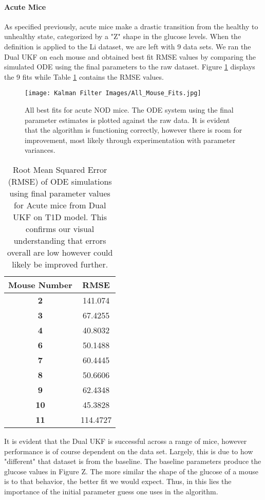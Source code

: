 \documentclass{article}
\begin{document}
\paragraph{Acute Mice}
As specified previously, acute mice make a drastic transition from the healthy to unhealthy state, categorized by a "Z" shape in the glucose levels. When the definition is applied to the Li dataset, we are left with 9 data sets. We ran the Dual UKF on each mouse and obtained best fit RMSE values by comparing the simulated ODE using the final parameters to the raw dataset. Figure \ref{fig:T1D_Dual_AllAcute_Plots} displays the 9 fits while Table \ref{table:T1D_Dual_AllAcute_RMSE} contains the RMSE values.\\

\begin{figure}[H]
    \centering
    \texttt{[image: Kalman Filter Images/All\_Mouse\_Fits.jpg]}
    \caption{All best fits for acute NOD mice. The ODE system using the final parameter estimates is plotted against the raw data. It is evident that the algorithm is functioning correctly, however there is room for improvement, most likely through experimentation with parameter variances.}
    \label{fig:T1D_Dual_AllAcute_Plots}
\end{figure}

\begin{table}[H]
  \begin{center}
    \label{tab:table1}
    \begin{tabular}{c|c} %
      \textbf{Mouse Number} & \textbf{RMSE} \\
      \hline
      \textbf{2} & 141.074\\
      \textbf{3} & 67.4255\\
      \textbf{4} & 40.8032\\
      \textbf{6} & 50.1488\\
      \textbf{7} & 60.4445\\
      \textbf{8} & 50.6606\\
      \textbf{9} & 62.4348\\
      \textbf{10} & 45.3828\\
      \textbf{11} & 114.4727
    \end{tabular}
    \caption{Root Mean Squared Error (RMSE) of ODE simulations using final parameter values for Acute mice from Dual UKF on T1D model. This confirms our visual understanding that errors overall are low however could likely be improved further.}
    \label{table:T1D_Dual_AllAcute_RMSE}
  \end{center}
\end{table}
It is evident that the Dual UKF is successful across a range of mice, however performance is of course dependent on the data set. Largely, this is due to how "different" that dataset is from the baseline. The baseline parameters produce the glucose values in Figure Z. The more similar the shape of the glucose of a mouse is to that behavior, the better fit we would expect. Thus, in this lies the importance of the initial parameter guess one uses in the algorithm.
\end{document}
